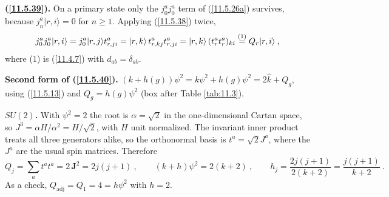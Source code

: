 \begin{tcolorbox}[breakable]
	\begin{remark}
		\textbf{(\ref{11.5.39}).} On a primary state only the $j^{a}_{0}j^{a}_{0}$ term of (\ref{11.5.26a}) survives, because $j^{a}_{n}\lvert r,i\rangle=0$ for $n\geq1$. Applying (\ref{11.5.38}) twice,
		\begin{equation*}
			j^{a}_{0}j^{a}_{0}\lvert r,i\rangle=j^{a}_{0}\lvert r,j\rangle t^{a}_{r,ji}=\lvert r,k\rangle\,t^{a}_{r,kj}t^{a}_{r,ji}=\lvert r,k\rangle\,(t^{a}_{r}t^{a}_{r})_{ki}\overset{(1)}{=}Q_{r}\lvert r,i\rangle\:,
		\end{equation*}
		where (1) is (\ref{11.4.7}) with $d_{ab}=\delta_{ab}$.

		\textbf{Second form of (\ref{11.5.40}).} $(k+h(g))\psi^{2}=k\psi^{2}+h(g)\psi^{2}=2\hat{k}+Q_{g}$, using (\ref{11.5.13}) and $Q_{g}=h(g)\psi^{2}$ (box after Table \ref{tab:11.3}).

		\textbf{$SU(2)$.} With $\psi^{2}=2$ the root is $\alpha=\sqrt{2}$ in the one-dimensional Cartan space, so $J^{3}=\alpha H/\alpha^{2}=H/\sqrt{2}$, with $H$ unit normalized. The invariant inner product treats all three generators alike, so the orthonormal basis is $t^{a}=\sqrt{2}J^{a}$, where the $J^{a}$ are the usual spin matrices. Therefore
		\begin{equation*}
			Q_{j}=\sum_{a}t^{a}t^{a}=2\,\mathbf{J}^{2}=2j(j+1)\:,\qquad (k+h)\psi^{2}=2(k+2)\:,\qquad h_{j}=\frac{2j(j+1)}{2(k+2)}=\frac{j(j+1)}{k+2}\:.
		\end{equation*}
		As a check, $Q_{\text{adj}}=Q_{1}=4=h\psi^{2}$ with $h=2$.
	\end{remark}
\end{tcolorbox}


